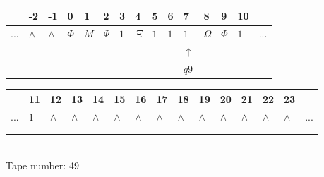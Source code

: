 \documentclass[11pt]{article}
\begin{document}
\begin{table}[H]
\centering
\begin{tabular}{lllllllllllllll}
 & -2 & -1 & 0 & 1 & 2 & 3 & 4 & 5 & 6 & 7 & 8 & 9 & 10 & \\
\hline
$...$ & \multicolumn{1}{|l|}{$\wedge$} & \multicolumn{1}{|l|}{$\wedge$} & \multicolumn{1}{|l|}{$\Phi$} & \multicolumn{1}{|l|}{$M$} & \multicolumn{1}{|l|}{$\Psi$} & \multicolumn{1}{|l|}{$1$} & \multicolumn{1}{|l|}{$\Xi$} & \multicolumn{1}{|l|}{$1$} & \multicolumn{1}{|l|}{$1$} & \multicolumn{1}{|l|}{$1$} & \multicolumn{1}{|l|}{$\Omega$} & \multicolumn{1}{|l|}{$\Phi$} & \multicolumn{1}{|l|}{$1$} & $...$\\
\hline
&  &  &  &  &  &  &  &  &  & $\uparrow$ &  &  &  &  \\
&  &  &  &  &  &  &  &  &  & $ q9 $ &  &  &  &  \\
\end{tabular}
\begin{tabular}{lllllllllllllll}
 & 11 & 12 & 13 & 14 & 15 & 16 & 17 & 18 & 19 & 20 & 21 & 22 & 23 & \\
\hline
$...$ & \multicolumn{1}{|l|}{$1$} & \multicolumn{1}{|l|}{$\wedge$} & \multicolumn{1}{|l|}{$\wedge$} & \multicolumn{1}{|l|}{$\wedge$} & \multicolumn{1}{|l|}{$\wedge$} & \multicolumn{1}{|l|}{$\wedge$} & \multicolumn{1}{|l|}{$\wedge$} & \multicolumn{1}{|l|}{$\wedge$} & \multicolumn{1}{|l|}{$\wedge$} & \multicolumn{1}{|l|}{$\wedge$} & \multicolumn{1}{|l|}{$\wedge$} & \multicolumn{1}{|l|}{$\wedge$} & \multicolumn{1}{|l|}{$\wedge$} & $...$\\
\hline
&  &  &  &  &  &  &  &  &  &  &  &  &  &  \\
&  &  &  &  &  &  &  &  &  &  &  &  &  &  \\
\end{tabular}
\\
Tape number: 49
\noindent\makebox[\linewidth]{\hdashrule{\textwidth}{1pt}{1pt}}\end{table}
\end{document}
